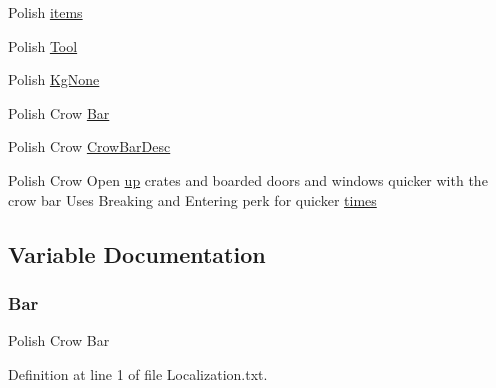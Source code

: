 \begin{DoxyCompactItemize}
\item 
Polish \mbox{\hyperlink{_sphere_i_i_01_take_01_and_01_replace_2_config_2_localization_8txt_a001d260768c3d8e262e51a6072deb955}{items}}
\item 
Polish \mbox{\hyperlink{_sphere_i_i_01_take_01_and_01_replace_2_config_2_localization_8txt_ae508515843f62862918c6a9f71ffd5db}{Tool}}
\item 
Polish \mbox{\hyperlink{_sphere_i_i_01_take_01_and_01_replace_2_config_2_localization_8txt_a87f4a7a401b962194242224f635df544}{Kg\+None}}
\item 
Polish Crow \mbox{\hyperlink{_sphere_i_i_01_take_01_and_01_replace_2_config_2_localization_8txt_a7086dac7ff576dd3c5dca2be4f8db71e}{Bar}}
\item 
Polish Crow \mbox{\hyperlink{_sphere_i_i_01_take_01_and_01_replace_2_config_2_localization_8txt_a4ec1c56c7325a87ce54b1248811303a4}{Crow\+Bar\+Desc}}
\item 
Polish Crow Open \mbox{\hyperlink{_the_01_restless_01_curse_2_config_2_localization_01-_01_quest_8txt_a2f8d5a9cc6c08e259de10d34d28f85c4}{up}} crates and boarded doors and windows quicker with the crow bar Uses Breaking and Entering perk for quicker \mbox{\hyperlink{_sphere_i_i_01_take_01_and_01_replace_2_config_2_localization_8txt_ad4fbe14714761ba0a1acc7ff36fdbdc5}{times}}
\end{DoxyCompactItemize}


\subsection{Variable Documentation}
\mbox{\label{_sphere_i_i_01_take_01_and_01_replace_2_config_2_localization_8txt_a7086dac7ff576dd3c5dca2be4f8db71e}} 
\subsubsection{\texorpdfstring{Bar}{Bar}}
{\footnotesize\ttfamily Polish Crow Bar}



Definition at line 1 of file Localization.\+txt.

\mbox{\label{_sphere_i_i_01_take_01_and_01_replace_2_config_2_localization_8txt_aada75e543d2eadaa69533d17cac8bd9a}} 
